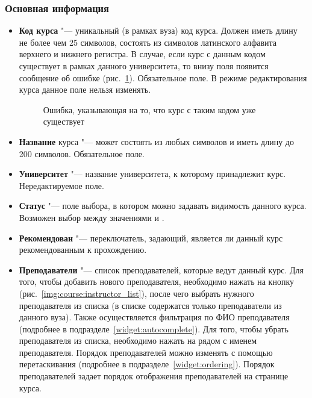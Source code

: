 \subsubsection{Основная информация}
	\begin{itemize}
		\item \textbf{Код курса} "--- уникальный (в рамках вуза) код курса. Должен иметь длину не более чем 25 символов, состоять из символов латинского алфавита верхнего и нижнего регистра. В случае, если курс с данным кодом существует в рамках данного университета, то внизу поля появится сообщение об ошибке (рис.~\ref{img:course:slug_error}). Обязательное поле. В режиме редактирования курса данное поле нельзя изменять.
		\begin{figure}[H]
			\caption{Ошибка, указывающая на то, что курс с таким кодом уже существует}
			\label{img:course:slug_error}
		\end{figure}
		\item \textbf{Название} курса "--- может состоять из любых символов и иметь длину до 200 символов. Обязательное поле.
		\item \textbf{Университет} "--- название университета, к которому принадлежит курс. Нередактируемое поле.
		\item \textbf{Статус} "--- поле выбора, в котором можно задавать видимость данного курса.
		Возможен выбор между значениями  и .
		\item \textbf{Рекомендован} "--- переключатель, задающий, является ли данный курс рекомендованным к прохождению.
		\item \textbf{Преподаватели} "--- список преподавателей, которые ведут данный курс. Для того, чтобы добавить нового преподавателя, необходимо нажать на кнопку  (рис.~\ref{img:course:instructor_list}), после чего выбрать нужного преподавателя из списка (в списке содержатся только преподаватели из данного вуза). Также осуществляется фильтрация по ФИО преподавателя (подробнее в подразделе~\ref{widget:autocomplete}). Для того, чтобы убрать преподавателя из списка, необходимо нажать на  рядом с именем преподавателя. Порядок преподавателей можно изменять с помощью перетаскивания (подробнее в подразделе~\ref{widget:ordering}). Порядок преподавателей задает порядок отображения преподавателей на странице курса.
		\begin{figure}[H]

\end{figure}
\end{itemize}
